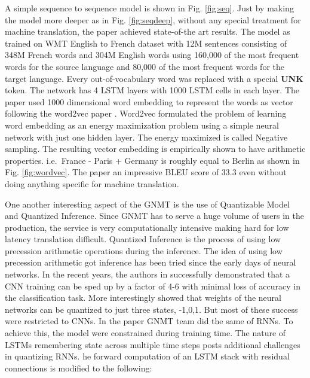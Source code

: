 \documentclass[a4paper]{article}
\begin{document}
A  simple sequence  to sequence  model  is shown in  Fig. \ref{fig:seq}. Just by
making the model more  deeper as  in Fig. \ref{fig:seqdeep}, without any special
treatment for  machine translation, the paper achieved state-of-the art results.
The model  as  trained on  WMT  English  to  French dataset with  12M  sentences
consisting of 348M French words and 304M English words using 160,000 of the most
frequent words for the source language and 80,000 of the most frequent words for
the  target language. Every  out-of-vocabulary word was replaced with  a special
\textbf{UNK} token. The network has 4 LSTM  layers with 1000 LSTM  cells in each
layer. The paper used  1000 dimensional word embedding to represent the words as
vector  following the  word2vec  paper  \cite{mikolov2013distributed}.  Word2vec
formulated  the problem of learning  word  embedding as  an energy  maximization
problem  using a simple neural network with just  one hidden  layer. The  energy
maximized is  called  Negative  sampling.  The  resulting  vector  embedding  is
empirically  shown  to  have  arithmetic properties. i.e. $\,$France  - Paris  +
Germany is roughly equal to Berlin as shown in Fig. \ref{fig:wordvec}. The paper
an impressive BLEU  score  of  33.3 even  without  doing  anything specific  for
machine translation.

One  another  interesting aspect of the GNMT is the use of Quantizable Model and
Quantized  Inference.  Since GNMT has  to  serve a  huge volume of users in  the
production, the  service is  very  computationally intensive making hard for low
latency translation difficult.  Quantized Inference is the  process of using low
precession  arithmetic  operations  during  the inference. The idea of using low
precession arithmetic got  inference  has  been tried  since  the early days  of
neural  networks.  In  the recent years,  the  authors in \cite{wu2016quantized}
successfully demonstrated that a CNN training can  be sped up by a factor of 4-6
with minimal loss of  accuracy  in the  classification task. More  interestingly
\cite{li2016ternary} showed that weights of the neural networks can be quantized
to just three states, -1,0,1. But most of these success were restricted to CNNs.
In the paper  GNMT team did the  same of  RNNs. To achieve this,  the model were
constrained during training  time. The nature of LSTMs remembering state  across
multiple time  steps posts  additional challenges in quantizing RNNs. he forward
computation  of  an  LSTM stack  with  residual connections is  modified to  the
following:
\end{document}
